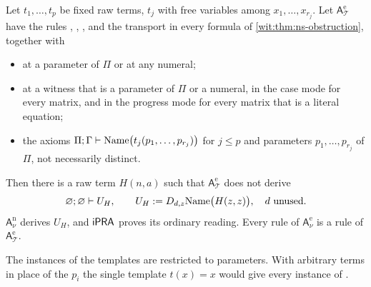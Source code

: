 \begin{theorem}
\label{wit:thm:ns-templates}
Let $t_1,\dots,t_p$ be fixed raw terms, $t_j$ with free variables among
$x_1,\dots,x_{r_j}$.  Let $\mathsf{A}^{\mathrm e}_{\mathcal T}$ have the
rules , , ,  and
the transport in every formula of \cref{wit:thm:ns-obstruction}, together
with
\begin{itemize}
\item {} at a parameter of $\Pi$ or at any numeral;
\item {} at a witness that is a parameter of $\Pi$ or a
 numeral, in the case mode for every matrix, and in the progress mode for
 every matrix that is a literal equation;
\item the axioms $\Pi;\Gamma\vdash\mathrm{Name}\bigl(t_j(p_1,\dots,p_{r_j})\bigr)$
 for $j\le p$ and parameters $p_1,\dots,p_{r_j}$ of $\Pi$, not necessarily
 distinct.
\end{itemize}
Then there is a raw term $H(n,a)$ such that $\mathsf{A}^{\mathrm e}_{\mathcal T}$
does not derive
\[
 \varnothing;\varnothing\vdash U_H,\qquad
 U_H\mathrel{:=}D_{d,z}\mathrm{Name}\bigl(H(z,z)\bigr),\quad d\text{ unused}.
\]
$\mathsf{A}^{\mathrm n}_{\nu}$ derives $U_H$, and $\mathsf{iPRA}$ proves its ordinary
reading.  Every rule of $\mathsf{A}^{\mathrm e}_{\nu}$ is a rule of
$\mathsf{A}^{\mathrm e}_{\mathcal T}$.
\end{theorem}

The instances of the templates are restricted to parameters.  With
arbitrary terms in place of the $p_i$ the single template $t(x)=x$ would
give every instance of .

